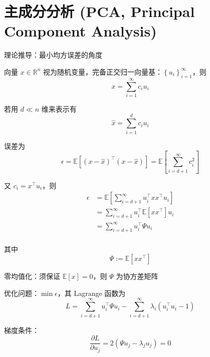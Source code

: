 \documentclass[openany]{ctexbook}
\theoremstyle{kaiti}
\theoremstyle{normal}
\begin{document}
\section{主成分分析 (PCA, Principal Component Analysis) }

理论推导：最小均方误差的角度

向量 $x\in \mathbb{R} ^n$ 视为随机变量，完备正交归一向量基：$\left\{ u_i \right\}_{i=1}^{\infty}$，则 
\begin{equation}
x=\sum_{i=1}^{\infty}c_iu_i
\end{equation}

若用 $d\ll n$ 维来表示有 
\begin{equation}
\hat{x}=\sum_{i=1}^{d}c_iu_i
\end{equation}

误差为
\begin{equation}
\epsilon =\mathbb{E} \left[\left(x-\hat{x} \right)^{\top}\left(x-\hat{x} \right)\right] =\mathbb{E} \left[\sum_{i=d+1}^{\infty}c_{i}^{2} \right]
\end{equation}

又 $c_i=x^{\top}u_i$，则
\begin{equation}
\begin{aligned}
  \epsilon 
  &=\mathbb{E} \left[\sum_{i=d+1}^{\infty}u_{i}^{\top}xx^{\top}u_i \right] \\
  &=\sum_{i=d+1}^{\infty}u_{i}^{\top}\mathbb{E} \left[xx^{\top} \right] u_i\\
  &=\sum_{i=d+1}^{\infty}u_{i}^{\top}\Psi u_i\\
\end{aligned}
\end{equation}

其中
\begin{equation}
\Psi :=\mathbb{E} \left[xx^{\top} \right]
\end{equation}

零均值化：须保证 $\mathbb{E} \left[x \right] =0$，则 $\Psi$ 为协方差矩阵

优化问题：$\min \epsilon$，其 Lagrange 函数为
\begin{equation}
L=\sum_{i=d+1}^{\infty}u_{i}^{\top}\Psi u_i-\sum_{i=d+1}^{\infty}\lambda_i\left(u_{i}^{\top}u_i-1 \right)
\end{equation}

梯度条件：
\begin{equation}
\frac{\partial L}{\partial u_j}=2\left(\Psi u_j-\lambda_ju_j \right)=0
\end{equation}
\end{document}
